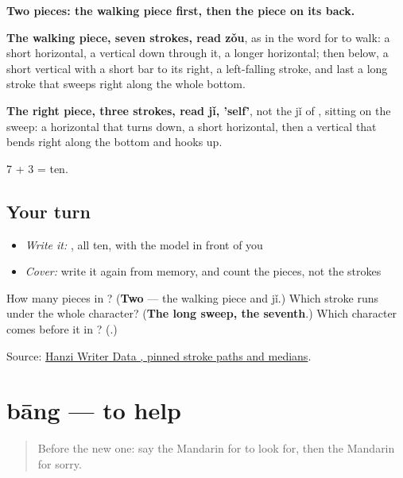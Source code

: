 \begin{quote}
\end{quote}

\textbf{Two pieces: the walking piece first, then the piece on its back.}

\textbf{The walking piece, seven strokes, read zǒu}, as in the word for to walk: a short horizontal, a vertical down through it, a longer horizontal; then below, a short vertical with a short bar to its right, a left-falling stroke, and last a long stroke that sweeps right along the whole bottom.

\textbf{The right piece, three strokes, read jǐ, 'self'}, not the jǐ of , sitting on the sweep: a horizontal that turns down, a short horizontal, then a vertical that bends right along the bottom and hooks up.

7 + 3 = ten.

\subsection*{Your turn}
\begin{itemize}
\raggedright
  \item \emph{Write it:} , all ten, with the model in front of you
  \item \emph{Cover:} write it again from memory, and count the pieces, not the strokes
\end{itemize}

\begin{tcolorbox}[breakable,colback=teal!4,colframe=teal!35!black,title={Before you move on}]
How many pieces in ? (\textbf{Two} — the walking piece and jǐ.) Which stroke runs under the whole character? (\textbf{The long sweep, the seventh}.) Which character comes before it in ? (\textbf{}.)

Source: \href{https://raw.githubusercontent.com/chanind/hanzi-writer-data/68d10a4b21150cae5e1ebbd223eed289cf32d90c/data/\%E8\%B5\%B7.json}{Hanzi Writer Data , pinned stroke paths and medians}.
\end{tcolorbox}
\section[bāng]{bāng — to help}

\label{lesson:ZH-C64-bang}



\begin{quote}
Before the new one: say the Mandarin for to look for, then the Mandarin for sorry.
\end{quote}

